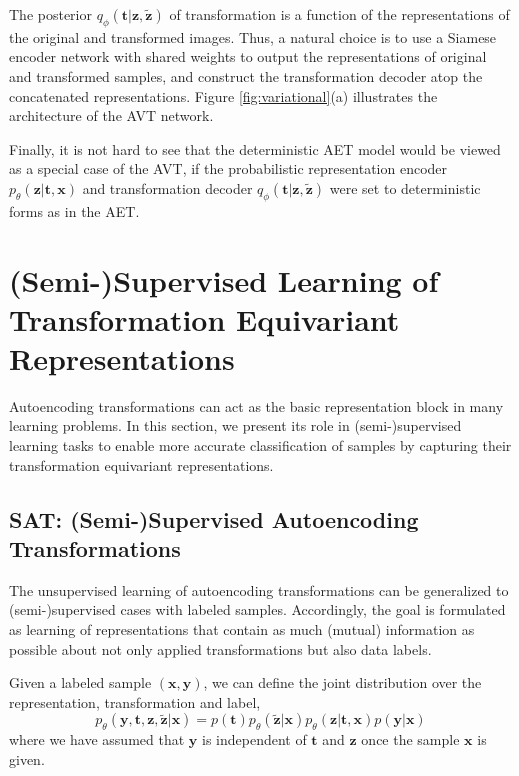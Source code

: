 \documentclass[10pt,journal,compsoc,twoside]{IEEEtran}
\begin{document}
The posterior $q_\phi(\mathbf t|\mathbf z,\mathbf {\tilde z})$ of transformation is a function of the representations of the original and transformed images. Thus, a natural choice is to use a Siamese encoder network with shared weights to output the representations of original and transformed samples, and construct the transformation decoder atop the concatenated representations. Figure \ref{fig:variational}(a) illustrates the architecture of the AVT network.

Finally, it is not hard to see that the deterministic AET model would be viewed as a special case of the AVT, if the probabilistic representation encoder $p_\theta(\mathbf z|\mathbf t,\mathbf x)$ and transformation decoder $q_\phi(\mathbf t|\mathbf z,\mathbf {\tilde z})$ were set to deterministic forms as in the AET.



\section{(Semi-)Supervised Learning of Transformation Equivariant Representations}\label{sec:sup}

Autoencoding transformations can act as the basic representation block in many learning problems. In this section, we present its role in (semi-)supervised learning tasks to enable more accurate classification of samples by capturing their transformation equivariant representations.


\subsection{SAT: (Semi-)Supervised Autoencoding Transformations}

The unsupervised learning of autoencoding transformations can be generalized to (semi-)supervised cases with labeled samples. Accordingly, the goal is formulated as learning of representations that contain as much (mutual) information as possible about not only applied transformations but also data labels.

Given a labeled sample $(\mathbf x,\mathbf y)$, we can define the joint distribution over the representation, transformation and label,
$$
p_\theta(\mathbf y, \mathbf t, \mathbf z, \mathbf {\tilde z}|\mathbf x) =  p(\mathbf t) p_\theta(\mathbf {\tilde z}|\mathbf x) p_\theta(\mathbf z | \mathbf t, \mathbf x) p(\mathbf y|\mathbf x)
$$
where we have assumed that $\mathbf y$ is independent of $\mathbf t$ and $\mathbf z$ once the sample $\mathbf x$ is given.
\end{document}
